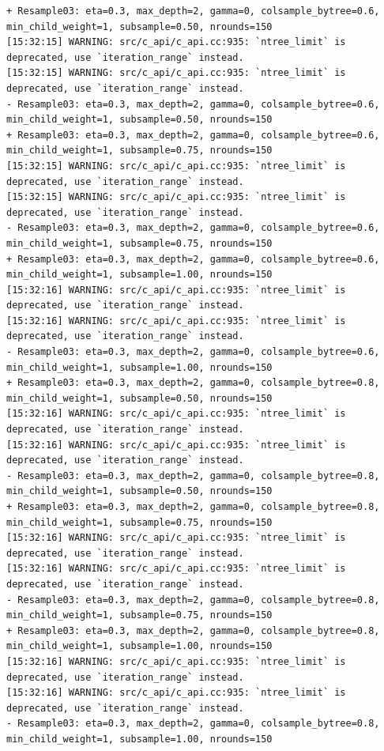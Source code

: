 \documentclass[
  letterpaper,
  DIV=11,
  numbers=noendperiod]{scrartcl}
\begin{document}
\begin{verbatim}
+ Resample03: eta=0.3, max_depth=2, gamma=0, colsample_bytree=0.6, min_child_weight=1, subsample=0.50, nrounds=150 
[15:32:15] WARNING: src/c_api/c_api.cc:935: `ntree_limit` is deprecated, use `iteration_range` instead.
[15:32:15] WARNING: src/c_api/c_api.cc:935: `ntree_limit` is deprecated, use `iteration_range` instead.
- Resample03: eta=0.3, max_depth=2, gamma=0, colsample_bytree=0.6, min_child_weight=1, subsample=0.50, nrounds=150 
+ Resample03: eta=0.3, max_depth=2, gamma=0, colsample_bytree=0.6, min_child_weight=1, subsample=0.75, nrounds=150 
[15:32:15] WARNING: src/c_api/c_api.cc:935: `ntree_limit` is deprecated, use `iteration_range` instead.
[15:32:15] WARNING: src/c_api/c_api.cc:935: `ntree_limit` is deprecated, use `iteration_range` instead.
- Resample03: eta=0.3, max_depth=2, gamma=0, colsample_bytree=0.6, min_child_weight=1, subsample=0.75, nrounds=150 
+ Resample03: eta=0.3, max_depth=2, gamma=0, colsample_bytree=0.6, min_child_weight=1, subsample=1.00, nrounds=150 
[15:32:16] WARNING: src/c_api/c_api.cc:935: `ntree_limit` is deprecated, use `iteration_range` instead.
[15:32:16] WARNING: src/c_api/c_api.cc:935: `ntree_limit` is deprecated, use `iteration_range` instead.
- Resample03: eta=0.3, max_depth=2, gamma=0, colsample_bytree=0.6, min_child_weight=1, subsample=1.00, nrounds=150 
+ Resample03: eta=0.3, max_depth=2, gamma=0, colsample_bytree=0.8, min_child_weight=1, subsample=0.50, nrounds=150 
[15:32:16] WARNING: src/c_api/c_api.cc:935: `ntree_limit` is deprecated, use `iteration_range` instead.
[15:32:16] WARNING: src/c_api/c_api.cc:935: `ntree_limit` is deprecated, use `iteration_range` instead.
- Resample03: eta=0.3, max_depth=2, gamma=0, colsample_bytree=0.8, min_child_weight=1, subsample=0.50, nrounds=150 
+ Resample03: eta=0.3, max_depth=2, gamma=0, colsample_bytree=0.8, min_child_weight=1, subsample=0.75, nrounds=150 
[15:32:16] WARNING: src/c_api/c_api.cc:935: `ntree_limit` is deprecated, use `iteration_range` instead.
[15:32:16] WARNING: src/c_api/c_api.cc:935: `ntree_limit` is deprecated, use `iteration_range` instead.
- Resample03: eta=0.3, max_depth=2, gamma=0, colsample_bytree=0.8, min_child_weight=1, subsample=0.75, nrounds=150 
+ Resample03: eta=0.3, max_depth=2, gamma=0, colsample_bytree=0.8, min_child_weight=1, subsample=1.00, nrounds=150 
[15:32:16] WARNING: src/c_api/c_api.cc:935: `ntree_limit` is deprecated, use `iteration_range` instead.
[15:32:16] WARNING: src/c_api/c_api.cc:935: `ntree_limit` is deprecated, use `iteration_range` instead.
- Resample03: eta=0.3, max_depth=2, gamma=0, colsample_bytree=0.8, min_child_weight=1, subsample=1.00, nrounds=150 

\end{verbatim}
\end{document}
